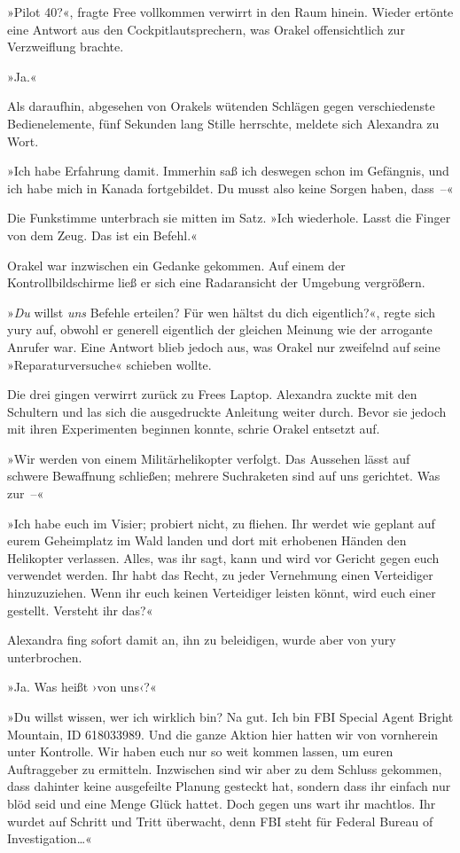 »Pilot 40?«, fragte Free vollkommen verwirrt in den Raum hinein. Wieder ertönte eine Antwort aus den Cockpitlautsprechern, was Orakel offensichtlich zur Verzweiflung brachte.

»Ja.«

Als daraufhin, abgesehen von Orakels wütenden Schlägen gegen verschiedenste Bedienelemente, fünf Sekunden lang Stille herrschte, meldete sich Alexandra zu Wort.

»Ich habe Erfahrung damit. Immerhin saß ich deswegen schon im Gefängnis, und ich habe mich in Kanada fortgebildet. Du musst also keine Sorgen haben, dass~–«

Die Funkstimme unterbrach sie mitten im Satz. »Ich wiederhole. Lasst die Finger von dem Zeug. Das ist ein Befehl.«

Orakel war inzwischen ein Gedanke gekommen. Auf einem der Kontrollbildschirme ließ er sich eine Radaransicht der Umgebung vergrößern.

»\emph{Du} willst \emph{uns} Befehle erteilen? Für wen hältst du dich eigentlich?«, regte sich yury auf, obwohl er generell eigentlich der gleichen Meinung wie der arrogante Anrufer war. Eine Antwort blieb jedoch aus, was Orakel nur zweifelnd auf seine »Reparaturversuche« schieben wollte.

Die drei gingen verwirrt zurück zu Frees Laptop. Alexandra zuckte mit den Schultern und las sich die ausgedruckte Anleitung weiter durch. Bevor sie jedoch mit ihren Experimenten beginnen konnte, schrie Orakel entsetzt auf.

»Wir werden von einem Militärhelikopter verfolgt. Das Aussehen lässt auf schwere Bewaffnung schließen; mehrere Suchraketen sind auf uns gerichtet. Was zur~–«

»Ich habe euch im Visier; probiert nicht, zu fliehen. Ihr werdet wie geplant auf eurem Geheimplatz im Wald landen und dort mit erhobenen Händen den Helikopter verlassen. Alles, was ihr sagt, kann und wird vor Gericht gegen euch verwendet werden. Ihr habt das Recht, zu jeder Vernehmung einen Verteidiger hinzuzuziehen. Wenn ihr euch keinen Verteidiger leisten könnt, wird euch einer gestellt. Versteht ihr das?«

Alexandra fing sofort damit an, ihn zu beleidigen, wurde aber von yury unterbrochen.

»Ja. Was heißt ›von uns‹?«

»Du willst wissen, wer ich wirklich bin? Na gut. Ich bin FBI Special Agent Bright Mountain, ID 618033989. Und die ganze Aktion hier hatten wir von vornherein unter Kontrolle. Wir haben euch nur so weit kommen lassen, um euren Auftraggeber zu ermitteln. Inzwischen sind wir aber zu dem Schluss gekommen, dass dahinter keine ausgefeilte Planung gesteckt hat, sondern dass ihr einfach nur blöd seid und eine Menge Glück hattet. Doch gegen uns wart ihr machtlos. Ihr wurdet auf Schritt und Tritt überwacht, denn FBI steht für Federal Bureau of Investigation…«

